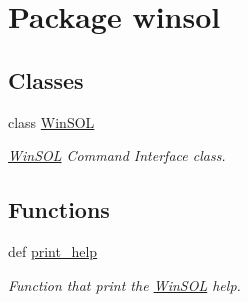 \hypertarget{namespacewinsol}{
\section{Package winsol}
\label{namespacewinsol}
}


\subsection*{Classes}
\begin{CompactItemize}
\item 
class \hyperlink{classwinsol_1_1WinSOL}{Win\-SOL}
\begin{CompactList}\small\item\em \hyperlink{classwinsol_1_1WinSOL}{Win\-SOL} Command Interface class. \item\end{CompactList}\end{CompactItemize}
\subsection*{Functions}
\begin{CompactItemize}
\item 
def \hyperlink{namespacewinsol_1d428628bd033b6912f0001e379aedf5}{print\_\-help}
\begin{CompactList}\small\item\em Function that print the \hyperlink{classwinsol_1_1WinSOL}{Win\-SOL} help. \item\end{CompactList}\end{CompactItemize}
